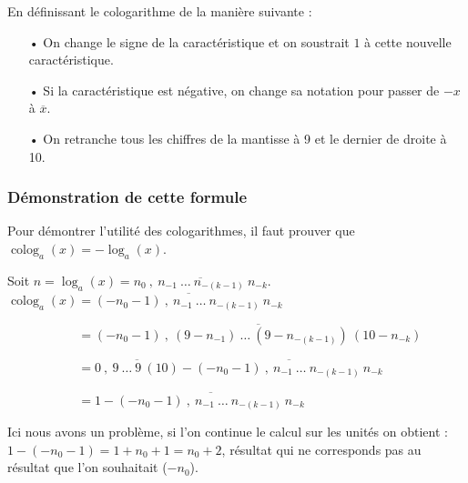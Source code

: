 \documentclass[a4paper, twoside]{article}
\begin{document}
	En définissant le cologarithme de la manière suivante :
	\begin{itemize}
		\item[•] On change le signe de la caractéristique et on soustrait $1$ à cette nouvelle caractéristique.
		\item[•] Si la caractéristique est négative, on change sa notation pour passer de $-x$ à $\overline{x}$. 
		\item[•] On retranche tous les chiffres de la mantisse à 9 et le dernier de droite à 10.
	\end{itemize}

	\vspace{2 mm}

	\subsubsection*{Démonstration de cette formule}

	Pour démontrer l'utilité des cologarithmes, il faut prouver que $\operatorname{colog}_a (x) = -\log_a(x)$.

	Soit $n = \log_a(x) = \overline{n_{0}~,~n_{-1}~\dots~n_{-(k-1)}~n_{-k}}$.\\

	$\operatorname{colog}_a (x) = \overline{(-n_{0}-1)~,~n_{-1}~\dots~n_{-(k-1)}~n_{-k}}$

	\vspace{2 mm}

	$\phantom{\operatorname{colog}_a (x)} = \overline{(-n_{0}-1)~,~(9-n_{-1})~\dots~(9-n_{-(k-1)})~(10-n_{-k})}$

	\vspace{2 mm}

	$\phantom{\operatorname{colog}_a (x)} = \overline{0~,~9~\dots~9~(10)} - \overline{(-n_{0}-1)~,~n_{-1}~\dots~n_{-(k-1)}~
	n_{-k}}  $

	\vspace{2 mm}

	$\phantom{\operatorname{colog}_a (x)} = 1 - \overline{(-n_{0}-1)~,~n_{-1}~\dots~n_{-(k-1)}~
	n_{-k}}  $\\

	\vspace{-2 mm}

	Ici nous avons un problème, si l'on continue le calcul sur les unités on obtient : $1 - (-n_{0}-1) = 1 + n_{0} + 1 = n_{0} + 2$, résultat qui ne corresponds pas au résultat que l'on souhaitait ($-n_{0}$).\\
\end{document}

